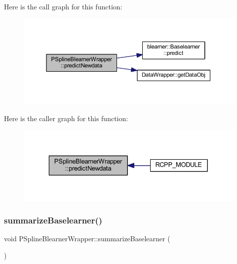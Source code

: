 Here is the call graph for this function\+:
\nopagebreak
\begin{figure}[H]
\begin{center}
\leavevmode
\includegraphics[width=350pt]{class_p_spline_blearner_wrapper_af90fe0fce13519086f8e54fe4d2cc539_cgraph}
\end{center}
\end{figure}
Here is the caller graph for this function\+:
\nopagebreak
\begin{figure}[H]
\begin{center}
\leavevmode
\includegraphics[width=329pt]{class_p_spline_blearner_wrapper_af90fe0fce13519086f8e54fe4d2cc539_icgraph}
\end{center}
\end{figure}
\mbox{\label{class_p_spline_blearner_wrapper_a7796ee928de438649ede7aa1aa57263a}} 
\subsubsection{\texorpdfstring{summarize\+Baselearner()}{summarizeBaselearner()}}
{\footnotesize\ttfamily void P\+Spline\+Blearner\+Wrapper\+::summarize\+Baselearner (\begin{DoxyParamCaption}{ }\end{DoxyParamCaption})\hspace{0.3cm}{\ttfamily [inline]}}

